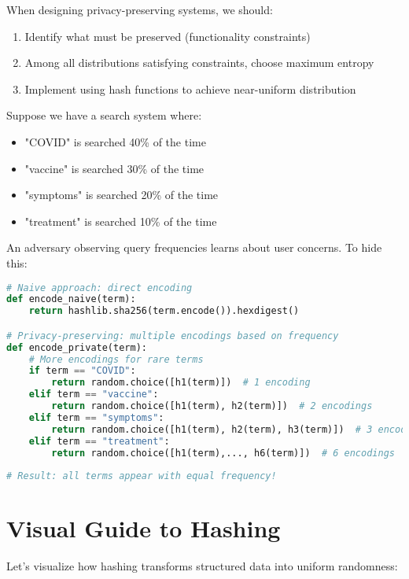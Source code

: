 When designing privacy-preserving systems, we should:
\begin{enumerate}
    \item Identify what must be preserved (functionality constraints)
    \item Among all distributions satisfying constraints, choose maximum entropy
    \item Implement using hash functions to achieve near-uniform distribution
\end{enumerate}

\begin{example}
Suppose we have a search system where:
\begin{itemize}
    \item "COVID" is searched 40\% of the time
    \item "vaccine" is searched 30\% of the time  
    \item "symptoms" is searched 20\% of the time
    \item "treatment" is searched 10\% of the time
\end{itemize}

An adversary observing query frequencies learns about user concerns. To hide this:

\begin{lstlisting}[language=Python]
# Naive approach: direct encoding
def encode_naive(term):
    return hashlib.sha256(term.encode()).hexdigest()

# Privacy-preserving: multiple encodings based on frequency
def encode_private(term):
    # More encodings for rare terms
    if term == "COVID":
        return random.choice([h1(term)])  # 1 encoding
    elif term == "vaccine":
        return random.choice([h1(term), h2(term)])  # 2 encodings
    elif term == "symptoms":
        return random.choice([h1(term), h2(term), h3(term)])  # 3 encodings
    elif term == "treatment":
        return random.choice([h1(term),..., h6(term)])  # 6 encodings
        
# Result: all terms appear with equal frequency!
\end{lstlisting}
\end{example}

\section{Visual Guide to Hashing}

Let's visualize how hashing transforms structured data into uniform randomness:

